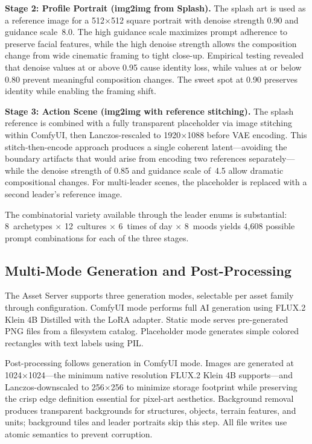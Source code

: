 \documentclass[conference]{IEEEtran}
\begin{document}
\textbf{Stage 2: Profile Portrait (img2img from Splash).} The splash art
is used as a reference image for a 512$\times$512 square portrait with
denoise strength 0.90 and guidance scale~8.0. The high guidance scale
maximizes prompt adherence to preserve facial features, while the high
denoise strength allows the composition change from wide cinematic framing
to tight close-up. Empirical testing revealed that denoise values at or
above 0.95 cause identity loss, while values at or below 0.80 prevent
meaningful composition changes. The sweet spot at 0.90 preserves identity
while enabling the framing shift.

\textbf{Stage 3: Action Scene (img2img with reference stitching).} The
splash reference is combined with a fully transparent placeholder via
image stitching within ComfyUI, then Lanczos-rescaled to 1920$\times$1088
before VAE encoding. This stitch-then-encode approach produces a single
coherent latent---avoiding the boundary artifacts that would arise from
encoding two references separately---while the denoise strength of 0.85 and
guidance scale of~4.5 allow dramatic compositional changes. For multi-leader
scenes, the placeholder is replaced with a second leader's reference image.

The combinatorial variety available through the leader enums is
substantial: 8~archetypes $\times$ 12~cultures $\times$ 6~times of day
$\times$ 8~moods yields 4,608 possible prompt combinations for each of the
three stages.

\subsection{Multi-Mode Generation and Post-Processing}

The Asset Server supports three generation modes, selectable per asset
family through configuration. ComfyUI mode performs full AI generation
using FLUX.2 Klein 4B Distilled with the LoRA adapter. Static mode serves
pre-generated PNG files from a filesystem catalog. Placeholder mode
generates simple colored rectangles with text labels using PIL.

Post-processing follows generation in ComfyUI mode. Images are generated at 1024$\times$1024---the minimum native resolution
FLUX.2 Klein 4B supports---and Lanczos-downscaled to 256$\times$256 to
minimize storage footprint while preserving the crisp edge definition
essential for pixel-art aesthetics. Background
removal produces transparent backgrounds for structures, objects, terrain
features, and units; background tiles and leader portraits skip this step.
All file writes use atomic semantics to prevent corruption.
\end{document}
